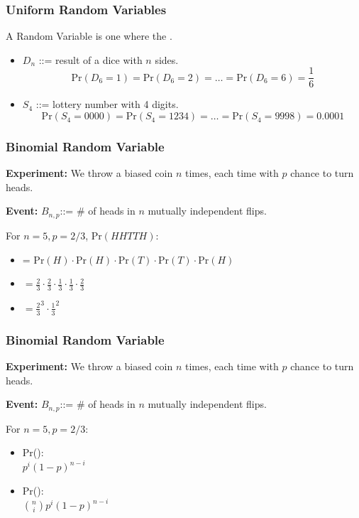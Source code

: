 \documentclass{beamer}
\begin{document}
\begin{frame}
  \frametitle{Uniform Random Variables}

  A  Random Variable is one where the .

  \vfill

  \begin{itemize}
  \item $D_n$ ::= result of a  dice with $n$ sides.
    \begin{equation*}
      \text{Pr}(D_6 = 1) = \text{Pr}(D_6 = 2) = \ldots = \text{Pr}(D_6 = 6) =
      \frac{1}{6}
    \end{equation*}
    \bigskip

  \item $S_4$ ::= lottery number with 4 digits.
    \begin{equation*}
      \text{Pr}(S_4 = 0000) = \text{Pr}(S_4 = 1234) = \ldots =
      \text{Pr}(S_4 = 9998) = 0.0001
    \end{equation*}
  \end{itemize}
  
\end{frame}

\begin{frame}
  \frametitle{Binomial Random Variable}

  {\bf Experiment:} We throw a biased coin $n$ times, each time with
  $p$ chance to turn heads.
  \bigskip

  {\bf Event:} $B_{n,p}$::= \# of heads in $n$ mutually independent
  flips.

  \vfill

  For $n = 5, p = 2/3$, Pr$(HHTTH)$:
  \begin{itemize}
  \item<2-> = Pr$(H)\cdot$Pr$(H)\cdot$Pr$(T)\cdot$Pr$(T)\cdot$Pr$(H)$
  \item<3-> $=
    \frac{2}{3}\cdot\frac{2}{3}\cdot\frac{1}{3}\cdot\frac{1}{3}\cdot\frac{2}{3}$
  \item<4-> $= \frac{2}{3}^3\cdot\frac{1}{3}^2$
  \end{itemize}
\end{frame}

\begin{frame}
  \frametitle{Binomial Random Variable}

  {\bf Experiment:} We throw a biased coin $n$ times, each time with
  $p$ chance to turn heads.
  \bigskip

  {\bf Event:} $B_{n,p}$::= \# of heads in $n$ mutually independent
  flips.

  \vfill

  For $n = 5, p = 2/3$:
  \begin{itemize}
  \item Pr():\\
    $p^i(1-p)^{n-i}$
    \bigskip
    
  \item Pr():\\
    $\binom{n}{i}p^i(1-p)^{n-i}$
  \end{itemize}
\end{frame}
\end{document}
